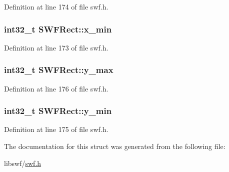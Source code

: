 Definition at line 174 of file swf.\-h.

\hypertarget{struct_s_w_f_rect_a8a6e16836789a2ad0f04a47571521da5}{
\subsubsection[{x\-\_\-min}]{\setlength{\rightskip}{0pt plus 5cm}int32\-\_\-t S\-W\-F\-Rect\-::x\-\_\-min}}\label{struct_s_w_f_rect_a8a6e16836789a2ad0f04a47571521da5}


Definition at line 173 of file swf.\-h.

\hypertarget{struct_s_w_f_rect_ad4030c2fb8cf190685abbb1db5b60d9c}{
\subsubsection[{y\-\_\-max}]{\setlength{\rightskip}{0pt plus 5cm}int32\-\_\-t S\-W\-F\-Rect\-::y\-\_\-max}}\label{struct_s_w_f_rect_ad4030c2fb8cf190685abbb1db5b60d9c}


Definition at line 176 of file swf.\-h.

\hypertarget{struct_s_w_f_rect_a02bf454cdaad92d3e78497f85dccda5d}{
\subsubsection[{y\-\_\-min}]{\setlength{\rightskip}{0pt plus 5cm}int32\-\_\-t S\-W\-F\-Rect\-::y\-\_\-min}}\label{struct_s_w_f_rect_a02bf454cdaad92d3e78497f85dccda5d}


Definition at line 175 of file swf.\-h.



The documentation for this struct was generated from the following file\-:\begin{DoxyCompactItemize}
\item 
libswf/\hyperlink{swf_8h}{swf.\-h}\end{DoxyCompactItemize}
